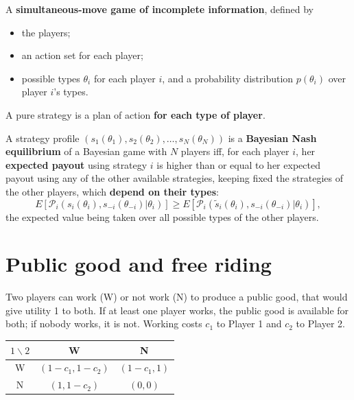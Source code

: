 \documentclass[11pt,a4paper,openany]{book}
\begin{document}
\begin{defnbox}[title=Bayesian game]
A \textbf{simultaneous-move game of incomplete information}, defined by
\begin{itemize}
  \item the players;
  \item an action set for each player;
  \item possible types $\theta_i$ for each player $i$, and a probability distribution
        $p(\theta_i)$ over player $i$'s types.
\end{itemize}
A pure strategy is a plan of action \textbf{for each type of player}.
\end{defnbox}


\begin{defnbox}[title=Bayesian Nash equilibrium (BNE)]
A strategy profile $(s_1(\theta_1), s_2(\theta_2), \ldots, s_N(\theta_N))$ is a
\textbf{Bayesian Nash equilibrium} of a Bayesian game with $N$ players iff, for each player
$i$, her \textbf{expected payout} using strategy $i$ is higher than or equal to her expected
payout using any of the other available strategies, keeping fixed the strategies of the other
players, which \textbf{depend on their types}:
\[
E[\mathcal{P}_i(s_i(\theta_i), s_{-i}(\theta_{-i}) | \theta_i)] \ge
E[\mathcal{P}_i(\tilde{s}_i(\theta_i), s_{-i}(\theta_{-i}) | \theta_i)],
\]
the expected value being taken over all possible types of the other players.
\end{defnbox}


\section{Public good and free riding}

\begin{defnbox}[title=Public good game]
Two players can work (W) or not work (N) to produce a public good, that would give utility 1
to both. If at least one player works, the public good is available for both; if nobody works,
it is not. Working costs $c_1$ to Player 1 and $c_2$ to Player 2.
\begin{center}
\begin{tabular}{c|cc}
$1 \backslash 2$ & W & N \\ \hline
W & $(1-c_1, 1-c_2)$ & $(1-c_1, 1)$ \\
N & $(1, 1-c_2)$ & $(0,0)$
\end{tabular}
\end{center}
\end{defnbox}
\end{document}
